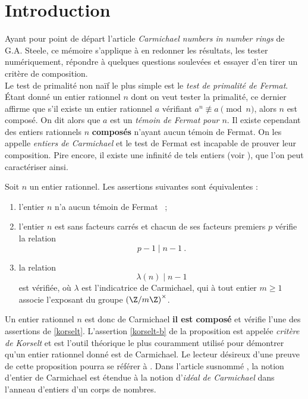 \section*{Introduction}

Ayant pour point de départ l'article \textit{Carmichael numbers in number rings} \cite{article} de G.A. Steele, ce mémoire s'applique à en redonner les résultats, les tester numériquement, répondre à quelques questions soulevées et essayer d'en tirer un critère de composition. \\

Le test de primalité non naïf le plus simple est le \emph{test de primalité de Fermat}. Étant donné un entier rationnel $n$ dont on veut tester la primalité, ce dernier affirme que s'il existe un entier rationnel $a$ vérifiant $a^n \not \equiv a \pmod{n}$, alors $n$ est composé. On dit alors que $a$ est un \emph{témoin de Fermat pour $n$}. Il existe cependant des entiers rationnels $n$ \textbf{composés} n'ayant aucun témoin de Fermat. On les appelle \emph{entiers de Carmichael} et le test de Fermat est incapable de prouver leur composition. Pire encore, il existe une infinité de tels entiers (voir \cite{InfiniteCarmichael}), que l'on peut caractériser ainsi.

\begin{proposition}\label{korselt} Soit $n$ un entier rationnel. Les assertions suivantes sont équivalentes :
	\begin{enumerate}[font=\normalshape]
		\item l'entier $n$ n'a aucun témoin de Fermat ~;
		\item l'entier $n$ est sans facteurs carrés et chacun de ses facteurs premiers $p$ vérifie la relation \[p-1 \mid n-1 ~.\] \label{korselt-b}
		\item la relation \[\lambda(n) \mid n-1\] est vérifiée, où $\lambda$ est l'indicatrice de Carmichael, qui à tout entier $m\geq1$ associe l'exposant du groupe $\left(\Z/m\Z\right)^\times$.
	\end{enumerate}
\end{proposition}

Un entier rationnel $n$ est donc de Carmichael \ssi \textbf{il est composé} et vérifie l'une des assertions de \ref{korselt}. L'assertion \ref{korselt-b} de la proposition est appelée \textit{critère de Korselt} et est l'outil théorique le plus couramment utilisé pour démontrer qu'un entier rationnel donné est de Carmichael. Le lecteur désireux d'une preuve de cette proposition pourra se référer à \cite[§3.3 p. 89]{Demazure}. Dans l'article susnommé \cite{article}, la notion d'entier de Carmichael est étendue à la notion d'\emph{idéal de Carmichael} dans l'anneau d'entiers d'un corps de nombres. 

